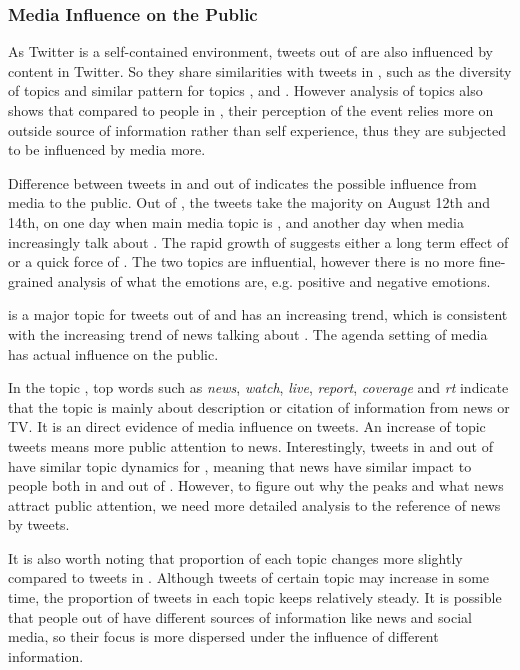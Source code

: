 \subsubsection{Media Influence on the Public}
As Twitter is a self-contained environment, tweets out of \stlouis are also influenced by content in Twitter. So they share similarities with tweets in \stlouis, such as the diversity of topics and similar pattern for topics \pray, \emotion and \newsreport. However analysis of topics also shows that compared to people in \stlouis, their perception of the event relies more on outside source of information rather than self experience, thus they are subjected to be influenced by media more.

Difference between tweets in and out of \stlouis indicates the possible influence from media to the public. Out of \stlouis, the \emotion tweets take the majority on August 12th and 14th, on one day when main media topic is \shootincident, and another day when media increasingly talk about \obamatalk. The rapid growth of \emotion suggests either a long term effect of \shootincident or a quick force of \obamatalk. The two topics are influential, however there is no more fine-grained analysis of what the emotions are, e.g. positive and negative emotions.

\racism is a major topic for tweets out of \stlouis and has an increasing trend, which is consistent with the increasing trend of news talking about \raceandcommunity. The agenda setting of media has actual influence on the public.

In the topic \newsreport, top words such as \emph{news}, \emph{watch}, \emph{live}, \emph{report}, \emph{coverage} and \emph{rt} indicate that the topic is mainly about description or citation of information from news or TV. It is an direct evidence of media influence on tweets. An increase of \newsreport topic tweets means more public attention to news. Interestingly, tweets in and out of \stlouis have similar topic dynamics for \newsreport, meaning that news have similar impact to people both in and out of \stlouis. However, to figure out why the peaks and what news attract public attention, we need more detailed analysis to the reference of news by tweets.

It is also worth noting that proportion of each topic changes more slightly compared to tweets in \stlouis. Although tweets of certain topic may increase in some time, the proportion of tweets in each topic keeps relatively steady. It is possible that people out of \stlouis have different sources of information like news and social media, so their focus is more dispersed under the influence of different information.

